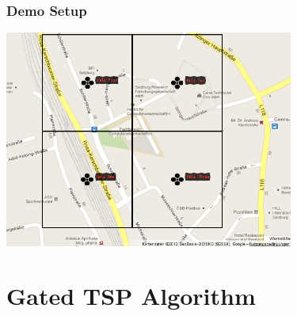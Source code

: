 \documentclass{beamer}
\begin{document}
\begin{frame}\frametitle{Demo Setup}%
        \begin{center}
                {\includegraphics[width=9.5cm]{out-00000-mod.png}}
        \end{center}
\end{frame}


\section{Gated TSP Algorithm}
\end{document}
